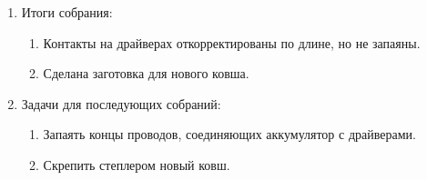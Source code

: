\begin{enumerate}
\begin{enumerate}
	\end{enumerate}
	\item Итоги собрания:
	\begin{enumerate}
		\item Контакты на драйверах откорректированы по длине, но не запаяны.
		
		\item Сделана заготовка для нового ковша.
		

	\end{enumerate}
	
	\item Задачи для последующих собраний:
	\begin{enumerate}
		\item Запаять концы проводов, соединяющих аккумулятор с драйверами.
		
		\item Скрепить степлером новый ковш.
		
	\end{enumerate}
	
\end{enumerate}
\fillpage